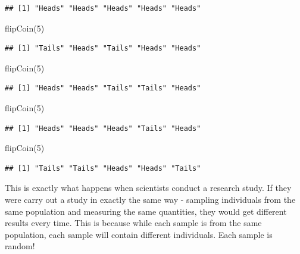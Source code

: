 \documentclass[
]{book}
\newenvironment{Shaded}{\begin{snugshade}}{\end{snugshade}}
\newcommand{\DecValTok}[1]{\textcolor[rgb]{0.00,0.00,0.81}{#1}}
\newcommand{\FunctionTok}[1]{\textcolor[rgb]{0.00,0.00,0.00}{#1}}
\newcommand{\NormalTok}[1]{#1}
\theoremstyle{definition}
\theoremstyle{definition}
\theoremstyle{definition}
\theoremstyle{remark}
\begin{document}
\begin{verbatim}
## [1] "Heads" "Heads" "Heads" "Heads" "Heads"
\end{verbatim}

\begin{Shaded}
\begin{Highlighting}[]
\FunctionTok{flipCoin}\NormalTok{(}\DecValTok{5}\NormalTok{)}
\end{Highlighting}
\end{Shaded}

\begin{verbatim}
## [1] "Tails" "Heads" "Tails" "Heads" "Heads"
\end{verbatim}

\begin{Shaded}
\begin{Highlighting}[]
\FunctionTok{flipCoin}\NormalTok{(}\DecValTok{5}\NormalTok{)}
\end{Highlighting}
\end{Shaded}

\begin{verbatim}
## [1] "Heads" "Heads" "Tails" "Tails" "Heads"
\end{verbatim}

\begin{Shaded}
\begin{Highlighting}[]
\FunctionTok{flipCoin}\NormalTok{(}\DecValTok{5}\NormalTok{)}
\end{Highlighting}
\end{Shaded}

\begin{verbatim}
## [1] "Heads" "Heads" "Heads" "Tails" "Heads"
\end{verbatim}

\begin{Shaded}
\begin{Highlighting}[]
\FunctionTok{flipCoin}\NormalTok{(}\DecValTok{5}\NormalTok{)}
\end{Highlighting}
\end{Shaded}

\begin{verbatim}
## [1] "Tails" "Tails" "Heads" "Heads" "Tails"
\end{verbatim}

This is exactly what happens when scientists conduct a research study. If they were carry out a study in exactly the same way - sampling individuals from the same population and measuring the same quantities, they would get different results every time. This is because while each sample is from the same population, each sample will contain different individuals. Each sample is random!
\end{document}
